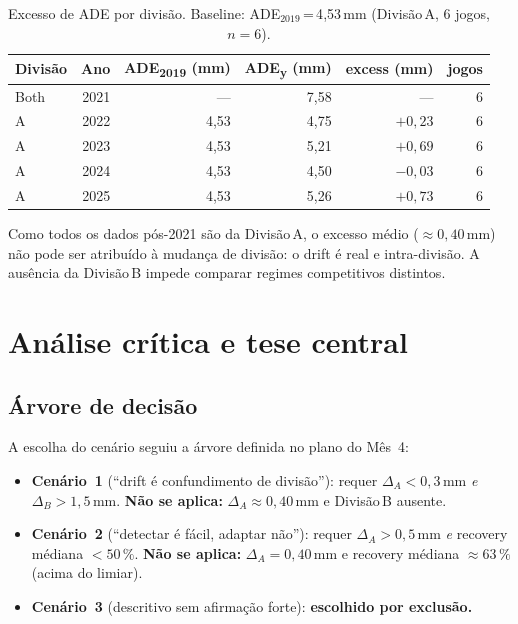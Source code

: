 \documentclass[11pt,a4paper]{article}
\begin{document}
\begin{table}[h]
\centering
\small
\begin{tabular}{l r r r r r}
\toprule
\textbf{Divis\~ao} & \textbf{Ano}
    & \textbf{ADE\textsubscript{2019} (mm)} & \textbf{ADE\textsubscript{y} (mm)}
    & \textbf{excess (mm)} & \textbf{jogos} \\
\midrule
Both & 2021 & ---  & 7{,}58 & ---       & 6 \\
A    & 2022 & 4{,}53 & 4{,}75 & $+0{,}23$ & 6 \\
A    & 2023 & 4{,}53 & 5{,}21 & $+0{,}69$ & 6 \\
A    & 2024 & 4{,}53 & 4{,}50 & $-0{,}03$ & 6 \\
A    & 2025 & 4{,}53 & 5{,}26 & $+0{,}73$ & 6 \\
\bottomrule
\end{tabular}
\caption{Excesso de ADE por divis\~ao. Baseline: ADE$_{2019}$\,=\,4{,}53\,mm
         (Divis\~ao\,A, 6 jogos, $n=6$).}
\label{tab:division}
\end{table}

Como todos os dados p\'os-2021 s\~ao da Divis\~ao\,A, o excesso m\'edio
($\approx 0{,}40$\,mm) n\~ao pode ser atribu\'ido \`a mudan\c{c}a de
divis\~ao: o drift \'e real e intra-divis\~ao. A aus\^encia da
Divis\~ao\,B impede comparar regimes competitivos distintos.

\section{An\'alise cr\'itica e tese central}

\subsection{\'Arvore de decis\~ao}

A escolha do cen\'ario seguiu a \'arvore definida no plano do M\^es~4:

\begin{itemize}[leftmargin=1.4em,itemsep=2pt]
    \item \textbf{Cen\'ario~1} (``drift \'e confundimento de divis\~ao''):
          requer $\Delta_A < 0{,}3$\,mm \emph{e} $\Delta_B > 1{,}5$\,mm.
          \textbf{N\~ao se aplica:} $\Delta_A \approx 0{,}40$\,mm e
          Divis\~ao\,B ausente.
    \item \textbf{Cen\'ario~2} (``detectar \'e f\'acil, adaptar n\~ao''):
          requer $\Delta_A > 0{,}5$\,mm \emph{e} recovery m\'ediana
          $< 50\,\%$. \textbf{N\~ao se aplica:} $\Delta_A = 0{,}40$\,mm
          e recovery m\'ediana $\approx 63\,\%$ (acima do limiar).
    \item \textbf{Cen\'ario~3} (descritivo sem afirma\c{c}\~ao forte):
          \textbf{escolhido por exclus\~ao.}
\end{itemize}
\end{document}
